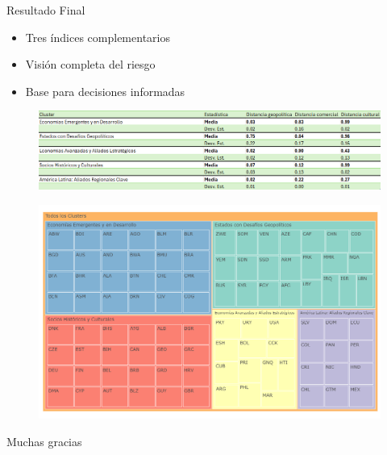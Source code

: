 \documentclass{beamer}
\begin{document}
\begin{frame}{Resultado Final}
    \begin{center}
    \end{center}
    
    \begin{itemize}
        \item Tres índices complementarios
        \item Visión completa del riesgo
        \item Base para decisiones informadas
    \end{itemize}
\end{frame}


\begin{frame}
    \begin{figure} %
        \includegraphics[width=1\linewidth]{Imagenes/tabla clusters.png}
        \label{fig:fig1}
    \end{figure}
\end{frame}


\begin{frame}
    \begin{figure} %
        \includegraphics[width=1\linewidth]{Imagenes/geopolitica.png}
        \label{fig:fig1}
    \end{figure}
\end{frame}

\begin{frame}
    \centering
    \Huge{Muchas gracias}
\end{frame}
\end{document}
